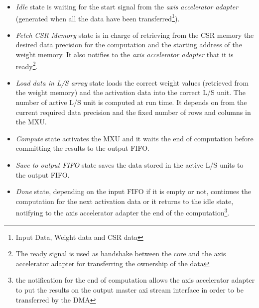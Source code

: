\begin{itemize}
\item \textit{Idle} state is waiting for the start signal from the \textit{axis accelerator adapter} (generated when all the data have been transferred\footnote{Input Data, Weight data and CSR data}).
\item \textit{Fetch CSR Memory} state is in charge of retrieving from the CSR memory the desired data precision for the computation and the starting address of the weight memory. It also notifies to the \textit{axis accelerator adapter} that it is ready\footnote{The ready signal is used as handshake between the core and the axis accelerator adapter for transferring the ownership of the data}.
\item \textit{Load data in L/S array} state loads the correct weight values (retrieved from the weight memory) and the activation data into the correct L/S unit. The number of active L/S unit is computed at run time. It depends on from the current required data precision and the fixed number of rows and columns in the MXU.
\item \textit{Compute} state activates the MXU and it waits the end of computation before committing the results to the output FIFO.
\item \textit{Save to output FIFO} state saves the data stored in the active L/S units to the output FIFO.
\item \textit{Done} state, depending on the input FIFO if it is empty or not, continues the computation for the next activation data or it returns to the idle state, notifying to the axis accelerator adapter the end of the computation\footnote{the notification for the end of computation allows the axis accelerator adapter to put the results on the output master axi stream interface in order to be transferred by the DMA}.
\end{itemize}


